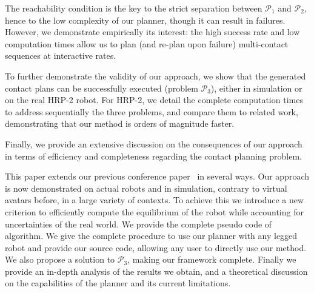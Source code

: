 The reachability condition is the key to the strict separation between $\mathcal{P}_1$ and $\mathcal{P}_2$, hence to the low complexity of our planner, though it
can result in failures. However, we demonstrate empirically its interest: the high success rate and low computation times allow us to plan (and re-plan upon failure) multi-contact sequences at \gls{interactive} rates.

To further demonstrate the validity of our approach, we show that the generated contact plans  can be successfully executed (problem  $\mathcal{P}_3$), either in simulation or on the real HRP-2 robot. For HRP-2, we detail the complete computation times to address sequentially the three problems, and compare them to related work, demonstrating that our method is orders of magnitude faster.

Finally, we provide an extensive discussion on the consequences of our approach in terms of efficiency and completeness regarding the contact planning problem. 

This paper extends our previous conference paper~\citep{tonneauisrr15} in several ways. Our approach is now demonstrated on actual robots and in simulation, contrary to virtual avatars before, in a large variety of contexts. To achieve this we introduce a new criterion to efficiently compute the equilibrium of the robot while accounting for uncertainties of the real world. We provide the complete pseudo code of algorithm. We give the complete procedure to use our planner with any legged robot and provide our source code, allowing any user to directly use our method. We also propose a solution to $\mathcal{P}_3$, making our framework complete. Finally we provide an in-depth analysis of the results we obtain, and a theoretical discussion on the capabilities of the planner and its current limitations.
